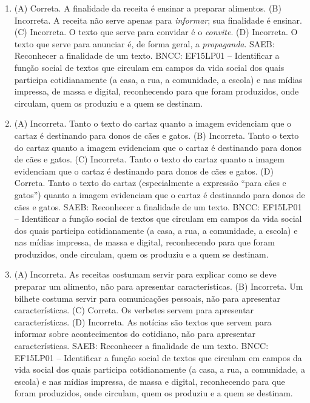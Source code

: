 \begin{enumerate}
\item
(A) Correta. A finalidade da receita é ensinar a preparar alimentos.
(B) Incorreta. A receita não serve apenas para \textit{informar}; sua
finalidade é ensinar.  
(C) Incorreta. O texto que serve para convidar é o \textit{convite}.
(D) Incorreta. O texto que serve para anunciar é, de forma geral, a 
\textit{propaganda}.
SAEB: Reconhecer a finalidade de um texto.
BNCC: EF15LP01 -- Identificar a função social de textos que circulam em
campos da vida social dos quais participa cotidianamente (a casa, a rua,
a comunidade, a escola) e nas mídias impressa, de massa e digital,
reconhecendo para que foram produzidos, onde circulam, quem os produziu
e a quem se destinam.

\item
(A) Incorreta. Tanto o texto do cartaz quanto a imagem evidenciam que
o cartaz é destinando para donos de cães e gatos.
(B) Incorreta. Tanto o texto do cartaz quanto a imagem evidenciam que
o cartaz é destinando para donos de cães e gatos.
(C) Incorreta. Tanto o texto do cartaz quanto a imagem evidenciam que
o cartaz é destinando para donos de cães e gatos.
(D) Correta. Tanto o texto do cartaz (especialmente a expressão ``para
cães e gatos'') quanto a imagem evidenciam que o cartaz é destinando para
donos de cães e gatos.
SAEB: Reconhecer a finalidade de um texto.
BNCC: EF15LP01 -- Identificar a função social de textos que circulam em
campos da vida social dos quais participa cotidianamente (a casa, a rua,
a comunidade, a escola) e nas mídias impressa, de massa e digital,
reconhecendo para que foram produzidos, onde circulam, quem os produziu
e a quem se destinam.

\item
(A) Incorreta. As receitas costumam servir para explicar como se deve
preparar um alimento, não para apresentar características.
(B) Incorreta. Um bilhete costuma servir para comunicações pessoais,
não para apresentar características.
(C) Correta. Os verbetes servem para apresentar características. 
(D) Incorreta. As notícias são textos que servem para informar sobre 
acontecimentos do cotidiano, não para apresentar características. 
SAEB: Reconhecer a finalidade de um texto.
BNCC: EF15LP01 -- Identificar a função social de textos que circulam em
campos da vida social dos quais participa cotidianamente (a casa, a rua,
a comunidade, a escola) e nas mídias impressa, de massa e digital,
reconhecendo para que foram produzidos, onde circulam, quem os produziu
e a quem se destinam.
\end{enumerate}

